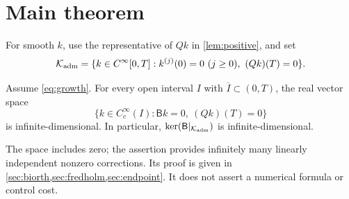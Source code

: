 \section{Main theorem}\label{sec:theorem}
For smooth \(k\), use the representative of \(Qk\) in \cref{lem:positive}, and set
\begin{equation}\label{eq:adm}
\mathcal K_{\rm adm}=\{k\in C^\infty[0,T]: k^{(j)}(0)=0\ (j\ge0),\ (Qk)(T)=0\}.
\end{equation}
\begin{theorem}\label{thm:main}
Assume \eqref{eq:growth}. For every open interval \(I\) with \(\overline I\subset(0,T)\), the real vector space
\begin{equation}\label{eq:kernelspace}
\{k\in C_c^\infty(I):\mathsf Bk=0,\ (Qk)(T)=0\}
\end{equation}
is infinite-dimensional. In particular, \(\ker(\mathsf B|_{\mathcal K_{\rm adm}})\) is infinite-dimensional.
\end{theorem}
The space includes zero; the assertion provides infinitely many linearly independent nonzero corrections. Its proof is given in \cref{sec:biorth,sec:fredholm,sec:endpoint}. It does not assert a numerical formula or control cost.
